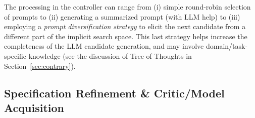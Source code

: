 \documentclass{article}
\newcommand{\rao}[1]{\noindent\textcolor{red}{#1}}
\theoremstyle{plain}
\theoremstyle{definition}
\theoremstyle{remark}
\begin{document}
The processing in the controller can range from (i) simple round-robin selection of prompts to (ii) generating a summarized prompt (with LLM help) to (iii) employing a {\em prompt diversification strategy} to elicit the next candidate from a different part of the implicit search space. This last strategy 
helps increase the completeness of the LLM candidate generation, and may involve domain/task-specific knowledge (see the discussion of Tree of Thoughts in Section~\ref{sec:contrary}). 






%
\subsection{Specification Refinement \& Critic/Model Acquisition}


\end{document}
